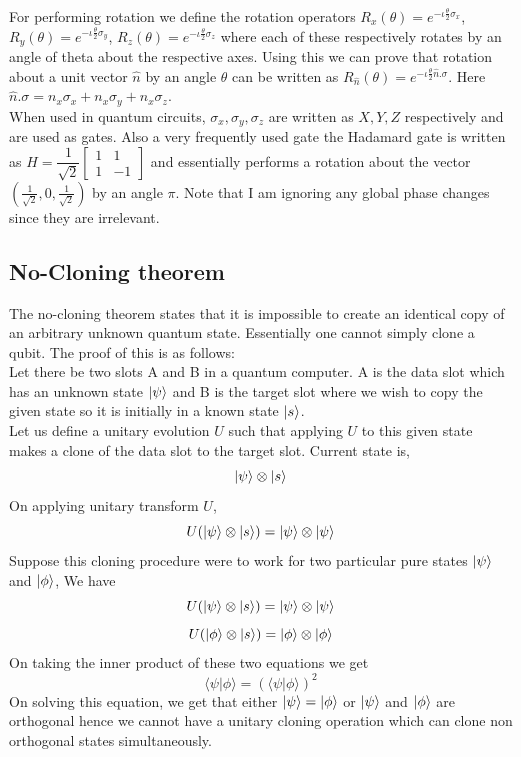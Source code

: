 \documentclass{report}
\begin{document}
For performing rotation we define the rotation operators $R_x(\theta) = e^{-\iota\frac{\theta}{2}\sigma_x}$, $R_y(\theta) =  e^{-\iota\frac{\theta}{2}\sigma_y}$, $R_z(\theta) =  e^{-\iota\frac{\theta}{2}\sigma_z}$ where each of these respectively rotates by an angle of theta about the respective axes.
Using this we can prove that rotation about a unit vector $\hat{n}$ by an angle $\theta$ can be written as $R_{\hat{n}}(\theta) = e^{-\iota\frac{\theta}{2}\hat{n}.\sigma}$. Here $\hat{n}.\sigma = n_x\sigma_x + n_x\sigma_y + n_x\sigma_z$.\\
When used in quantum circuits, $\sigma_x, \sigma_y, \sigma_z$ are written as $X, Y, Z$ respectively and are used as gates.
Also a very frequently used gate the Hadamard gate is written as $H = \dfrac{1}{\sqrt{2}}\begin{bmatrix}1 & 1\\1 & -1\end{bmatrix}$ and essentially performs a rotation about the vector $(\frac{1}{\sqrt{2}},0,\frac{1}{\sqrt{2}})$ by an angle $\pi$. Note that I am ignoring any global phase changes since they are irrelevant.

\subsection{No-Cloning theorem}
The no-cloning theorem states that it is impossible to create an identical copy of an arbitrary unknown quantum state. Essentially one cannot simply clone a qubit. The proof of this is as follows:\\
Let there be two slots A and B in a quantum computer. A is the data slot which has an unknown state $\ket{\psi}$ and B is the target slot where we wish to copy the given state so it is initially in a known state $\ket{s}$.\\
Let us define a unitary evolution $U$ such that applying $U$ to this given state makes a clone of the data slot to the target slot. Current state is,
\begin{equation}\ket{\psi}\otimes\ket{s}\end{equation}
On applying unitary transform $U$,
$$U(\ket{\psi}\otimes\ket{s}) = \ket{\psi}\otimes\ket{\psi}$$
Suppose this cloning procedure were to work for two particular pure states $\ket{\psi}$ and $\ket{\phi}$, We have
\begin{equation}U(\ket{\psi}\otimes\ket{s}) = \ket{\psi}\otimes\ket{\psi}\end{equation}
\begin{equation}U(\ket{\phi}\otimes\ket{s}) = \ket{\phi}\otimes\ket{\phi}\end{equation}
On taking the inner product of these two equations we get
\begin{equation}\langle\psi|\phi\rangle = (\langle\psi|\phi\rangle)^2\end{equation}
On solving this equation, we get that either $\ket{\psi} = \ket{\phi}$ or $\ket{\psi}$ and $\ket{\phi}$ are orthogonal hence we cannot have a unitary cloning operation which can clone non orthogonal states simultaneously. 
\end{document}
